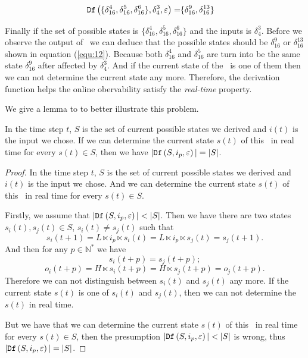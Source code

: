 \begin{equation}
\begin{split}
{\tt Df}\left(\{\delta_{16}^4,\delta_{16}^5,\delta_{16}^6\},\delta_4^3,\varepsilon\right)=&\{\delta_{16}^9,\delta_{16}^{13}\}
\end{split}
\label{equ:12}
\end{equation}

 Finally if the set of possible states is $\{\delta_{16}^4,\delta_{16}^5,\delta_{16}^6\}$ and the inputs is $\delta_4^3$. Before we observe the output of \BCN\ we can deduce that the possible states should be $\delta_{16}^9$ or $\delta_{16}^{13}$ shown in equation (\ref{equ:12}). Because both $\delta_{16}^4$ and $\delta_{16}^5$ are turn into be the same state $\delta_{16}^9$ after affected by $\delta_4^3$. And if the current state of the \BCN\ is one of them then we can not determine the current state any more. Therefore, the derivation function helps the online obervability satisfy the {\em real-time} property. 
 
 We give a lemma to to better illustrate this problem.
\begin{lemma}
 In the time step $t$, $S$ is the set of current possible states we derived and $i(t)$ is the input we chose. If we can determine the current state $s(t)$ of this \BCN\ in real time for every $s(t)\in S$, then we have 
 $|{\tt Df}\left(S,i_p,\varepsilon\right)|=|S|$.
 \label{lemm:1}
\end{lemma}

\begin{proof}
In the time step $t$, $S$ is the set of current possible states we derived and $i(t)$ is the input we chose. And we can determine the current state $s(t)$ of this \BCN\ in real time for every $s(t)\in S$. 

Firstly, we assume that $|\Ded\left(S,i_p,\varepsilon\right)|<|S|$. Then we have there are two states $s_i(t), s_j(t)\in S$, $s_i(t)\neq s_j(t)$ such that 
\[s_i(t+1)=L\ltimes i_p\ltimes s_i(t)=L\ltimes i_p\ltimes s_j(t)=s_j(t+1).\]
And then for any $p\in \mathbb{N}^*$ we have 
\[s_i(t+p)=s_j(t+p);\]
\[o_i(t+p)= H\ltimes{s_i(t+p)}= H\ltimes{s_j(t+p)}=o_j(t+p).\]
 Therefore we can not distinguish between $s_i(t)$ and $s_j(t)$ any more.
 If the current state $s(t)$ is one of $s_i(t)$ and $s_j(t)$, then we can not determine the $s(t)$ in real time. 
 
 But we have that we can determine the current state $s(t)$ of this \BCN\ in real time for every $s(t)\in S$, then the presumption $|\Ded\left(S,i_p,\varepsilon\right)|<|S|$ is wrong, thus $|{\tt Df}\left(S,i_p,\varepsilon\right)|=|S|$.
\end{proof}
 

